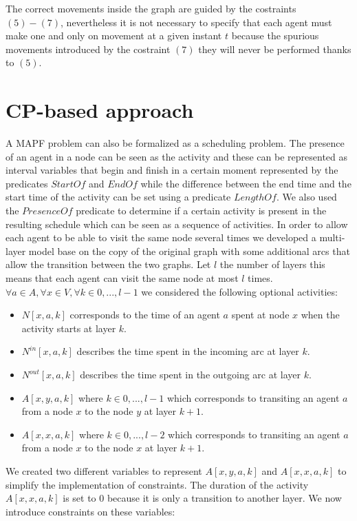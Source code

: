 \documentclass[12pt, a4paper, hidelinks]{article}
\begin{document}
The correct movements inside the graph are guided by the costraints $(5)-(7)$, nevertheless it is not necessary to specify that each agent must make one and only on movement at a given instant $t$ because the spurious movements introduced by the costraint $(7)$ they will never be performed thanks to $(5)$.

\section{CP-based approach}

A MAPF problem can also be formalized as a scheduling problem. The presence of an agent in a node can be seen as the activity and these can be represented as interval variables that begin and finish in a certain moment represented by the predicates $StartOf$ and $EndOf$ while the difference between the end time and the start time of the activity can be set using a predicate $LengthOf$. We also used the $PresenceOf$ predicate to determine if a certain activity is present in the resulting schedule which can be seen as a sequence of activities. In order to allow each agent to be able to visit the same node several times we developed a multi-layer model  base on the copy of the original graph with some additional arcs that allow the transition between the two graphs. Let $l$ the number of layers this means that each agent can visit the same node at most $l$ times.
$\forall a \in A, \forall x \in V, \forall k \in {0,...,l-1}$ we considered the following optional activities:
\begin{itemize}
\item $N[x,a,k]$ corresponds to the time of an agent $a$ spent at node $x$ when the activity starts at layer $k$.
\item $N^{in}[x,a,k]$ describes the time spent in the incoming arc at layer $k$.
\item $N^{out}[x,a,k]$ describes the time spent in the outgoing arc at layer $k$.
\item $A[x,y,a,k]$ where $k \in {0,...,l-1}$ which corresponds to transiting an agent $a$ from a node $x$ to the node $y$ at layer $k+1$.
\item $A[x,x,a,k]$ where $k \in {0,...,l-2}$ which corresponds to transiting an agent $a$ from a node $x$ to the node $x$ at layer $k+1$.
\end{itemize}

We created two different variables to represent $A[x,y,a,k]$ and $A[x,x,a,k]$ to simplify the implementation of constraints. The duration of the activity $A[x,x,a,k]$ is set to 0 because it is only a transition to another layer. 
We now introduce constraints on these variables:
\end{document}
